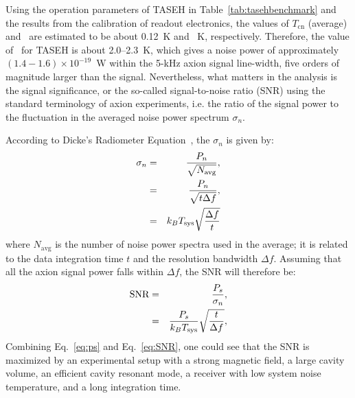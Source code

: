 Using the operation parameters of TASEH in Table~\ref{tab:tasehbenchmark} and 
the results from the calibration of readout electronics, 
the values of $T_\text{cn}$ (average) and \ta\ are estimated to be about 
0.12~K and \noise~K, respectively.  
Therefore, the value of \tsys\ for TASEH 
is about 2.0--2.3~K, which gives a noise power of approximately 
$\left(1.4-1.6\right)\times 10^{-19}$~W within the 5-kHz axion signal 
line-width, five 
orders of magnitude larger than the signal. Nevertheless, what matters in the 
analysis is the signal significance, or the so-called signal-to-noise ratio 
(SNR) using the standard terminology of axion experiments, i.e. the ratio of 
the signal power to the fluctuation in the averaged noise power spectrum 
$\sigma_n$. 

According to Dicke's Radiometer Equation~\cite{Dicke}, the $\sigma_n$ 
is given by: 
\begin{eqnarray}
 \sigma_n  &=&  \frac{P_n}{\sqrt{N_\text{avg}}}, \nonumber \\
           &=&  \frac{P_n}{\sqrt{t\Delta f}}, \nonumber \\
           &=&  k_BT_\text{sys}\sqrt{\frac{\Delta f}{t}} 
 \label{eq:sigman}
\end{eqnarray}
where $N_\text{avg}$ is the number of noise power spectra used in the 
average; it is related to the data integration time $t$ 
and the resolution bandwidth $\Delta f$.  
Assuming that all the axion signal power falls within $\Delta f$, 
the SNR will therefore be: 
\begin{eqnarray}
   \text{SNR} & = & \frac{P_s}{\sigma_n}, \nonumber \\
              & = & \frac{P_s}{k_BT_\text{sys}}\sqrt{\frac{t}{\Delta f}},
 \label{eq:SNR}
\end{eqnarray}  
Combining Eq.~\eqref{eq:ps} and Eq.~\eqref{eq:SNR},
one could see that the SNR is maximized by an experimental setup with 
a strong magnetic field, a large cavity volume, an efficient cavity 
resonant mode, a receiver with low system noise temperature, and a 
long integration time. 










